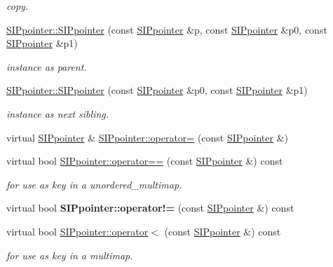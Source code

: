 \begin{DoxyCompactItemize}
\begin{DoxyCompactList}\small\item\em copy. \end{DoxyCompactList}\item 
\mbox{\hyperlink{group__table_gaa4c3c43c081bf789120e96683bc70cb3}{S\+I\+Ppointer\+::\+S\+I\+Ppointer}} (const \mbox{\hyperlink{classSIPpointer}{S\+I\+Ppointer}} \&p, const \mbox{\hyperlink{classSIPpointer}{S\+I\+Ppointer}} \&p0, const \mbox{\hyperlink{classSIPpointer}{S\+I\+Ppointer}} \&p1)
\begin{DoxyCompactList}\small\item\em instance as parent. \end{DoxyCompactList}\item 
\mbox{\hyperlink{group__table_ga12c22407821e96d6c7d0bca88392cbda}{S\+I\+Ppointer\+::\+S\+I\+Ppointer}} (const \mbox{\hyperlink{classSIPpointer}{S\+I\+Ppointer}} \&p0, const \mbox{\hyperlink{classSIPpointer}{S\+I\+Ppointer}} \&p1)
\begin{DoxyCompactList}\small\item\em instance as next sibling. \end{DoxyCompactList}\item 
virtual \mbox{\hyperlink{classSIPpointer}{S\+I\+Ppointer}} \& \mbox{\hyperlink{group__table_ga9855eef9600bbdd1e74343844e0c158c}{S\+I\+Ppointer\+::operator=}} (const \mbox{\hyperlink{classSIPpointer}{S\+I\+Ppointer}} \&)
\item 
virtual bool \mbox{\hyperlink{group__table_ga519f21be86b2ddb4fae2bab869434863}{S\+I\+Ppointer\+::operator==}} (const \mbox{\hyperlink{classSIPpointer}{S\+I\+Ppointer}} \&) const
\begin{DoxyCompactList}\small\item\em for use as key in a unordered\+\_\+multimap. \end{DoxyCompactList}\item 
\mbox{\label{group__table_ga58f25245c42e16d11738e74c66a63cf6}} 
virtual bool {\bfseries S\+I\+Ppointer\+::operator!=} (const \mbox{\hyperlink{classSIPpointer}{S\+I\+Ppointer}} \&) const
\item 
virtual bool \mbox{\hyperlink{group__table_gaefff5ba3579bd6174700ab1462fa13fb}{S\+I\+Ppointer\+::operator$<$}} (const \mbox{\hyperlink{classSIPpointer}{S\+I\+Ppointer}} \&) const
\begin{DoxyCompactList}\small\item\em for use as key in a multimap. \end{DoxyCompactList}\item 

\end{DoxyCompactItemize}
